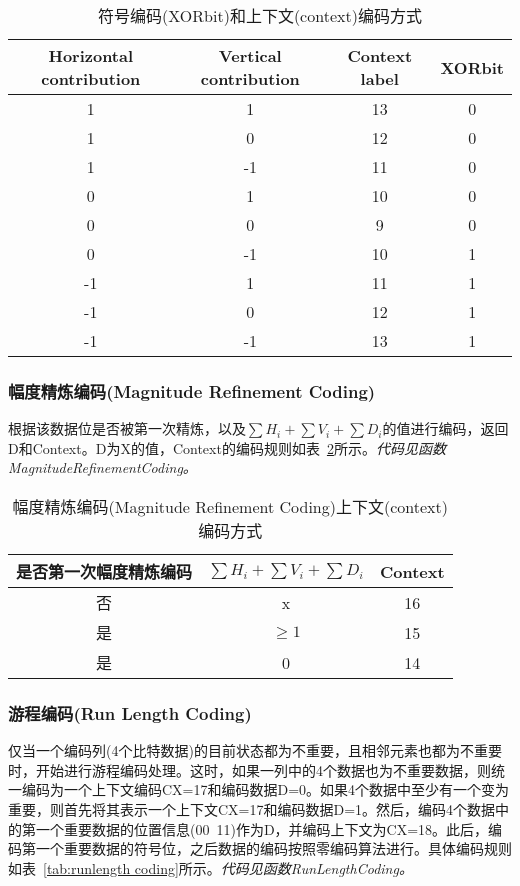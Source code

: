 \begin{table}[H]
\begin{center}
\begin{tabular}{|c|c|c|c|}
\hline
\textbf{Horizontal contribution} & \textbf{Vertical contribution} & \textbf{Context label} & \textbf{XORbit}\\
\hline
1 & 1 & 13 & 0\\
\hline
1 & 0 & 12 & 0\\
\hline
1 & -1 & 11 & 0\\
\hline
0 & 1 & 10 & 0\\
\hline
0 & 0 & 9 & 0\\
\hline
0 & -1 & 10 & 1\\
\hline
-1 & 1 & 11 & 1\\
\hline
-1 & 0 & 12 & 1\\
\hline
-1 & -1 & 13 & 1\\
\hline
\end{tabular}
\end{center}
\caption{符号编码(XORbit)和上下文(context)编码方式}
\label{tab:sign coding}
\end{table}

\subsubsection{幅度精炼编码(Magnitude Refinement Coding)}
根据该数据位是否被第一次精炼，以及$\sum H_i +  \sum V_i + \sum D_i$的值进行编码，返回D和Context。D为X的值，Context的编码规则如表{~\ref{tab:magnitude coding}}所示。\textit{代码见函数MagnitudeRefinementCoding。}

\begin{table}[H]
\begin{center}
\begin{tabular}{|c|c|c|}
\hline
\textbf{是否第一次幅度精炼编码}&\textbf{$\sum H_i +  \sum V_i + \sum D_i$}&\textbf{Context}\\
\hline
否&x&16\\
\hline
是&$\geq 1$ &15\\
\hline
是& 0 &14\\
\hline
\end{tabular}
\end{center}
\caption{幅度精炼编码(Magnitude Refinement Coding)上下文(context)编码方式}
\label{tab:magnitude coding}
\end{table}

\subsubsection{游程编码(Run Length Coding)}
仅当一个编码列(4个比特数据)的目前状态都为不重要，且相邻元素也都为不重要时，开始进行游程编码处理。这时，如果一列中的4个数据也为不重要数据，则统一编码为一个上下文编码CX=17和编码数据D=0。如果4个数据中至少有一个变为重要，则首先将其表示一个上下文CX=17和编码数据D=1。然后，编码4个数据中的第一个重要数据的位置信息(00~11)作为D，并编码上下文为CX=18。此后，编码第一个重要数据的符号位，之后数据的编码按照零编码算法进行。具体编码规则如表{~\ref{tab:runlength coding}}所示。\textit{代码见函数RunLengthCoding。}

